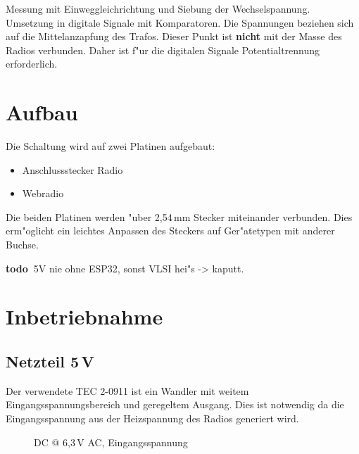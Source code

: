 \documentclass[ngerman,11pt,parskip=half] {scrartcl}
\newcommand {\todo} {\textbf{\color{red} todo\ }}
\newcommand {\tscopesize}{12cm}
\begin{document}
Messung mit Einweggleichrichtung und Siebung der Wechselspannung. Umsetzung in digitale Signale mit Komparatoren. Die Spannungen beziehen sich auf die Mittelanzapfung des Trafos. Dieser Punkt ist \textbf{nicht} mit der Masse des Radios verbunden. Daher ist f"ur die digitalen Signale Potentialtrennung erforderlich.

\section{Aufbau} \label{sec:aufbau}

Die Schaltung wird auf zwei Platinen aufgebaut:
\begin{itemize}
\item Anschlussstecker Radio
\item Webradio
\end{itemize}

Die beiden Platinen werden "uber 2,54\,mm Stecker miteinander verbunden. Dies erm"oglicht ein leichtes Anpassen des Steckers auf Ger"atetypen mit anderer Buchse.


\todo 5V nie ohne ESP32, sonst VLSI hei"s -> kaputt.


\section{Inbetriebnahme} \label{sec:inbetriebnahme}

\subsection{Netzteil 5\,V} \label{sec:inbetriebnahme:netzteil}

Der verwendete TEC 2-0911 ist ein Wandler mit weitem Eingangsspannungsbereich und geregeltem Ausgang. Dies ist notwendig da die Eingangsspannung aus der Heizspannung des Radios generiert wird.

\begin{figure}[H]
\centering
{}
\caption{DC @ 6,3\,V AC, Eingangsspannung} \label{fig:1}
\end{figure}
\end{document}
